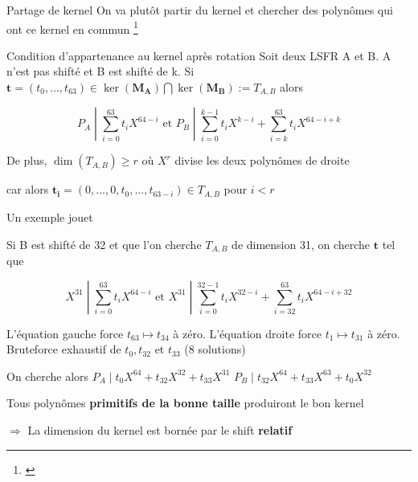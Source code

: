 \begin{frame}{Partage de kernel}
On va plutôt partir du kernel et chercher des polynômes qui ont ce kernel en commun \footnote{\cite{cryptoeprint:2021/829}}
\begin{block}{Condition d'appartenance au kernel après rotation}
    Soit deux LSFR A et B. A n'est pas shifté et B est shifté de k. Si $\mathbf{t}=(t_0,\dots,t_{63})\in\ker(\mathbf{M_A})\bigcap \ker(\mathbf{M_B}) := T_{A,B}$ alors

\[P_A \;|\; \displaystyle\sum_{i=0}^{63} t_i X^{64-i} \text{  et  } P_B \;|\; \displaystyle\sum_{i=0}^{k-1} t_i X^{k-i} + \displaystyle\sum_{i=k}^{63} t_i X^{64-i+k}\]

    De plus, $\dim(T_{A,B}) \geq r$ où $X^r$ divise les deux polynômes de droite
    
    \pause
    
    \small{car alors $\mathbf{t_i}=(0,...,0,t_0,\dots,t_{63-i})\in T_{A,B}$ pour $i<r$}
    \end{block}
\end{frame}

\begin{frame}{Un exemple jouet}
\begin{outline}
    \1  Si B est shifté de 32 et que l'on cherche $T_{A,B}$ de dimension 31, on cherche $\mathbf{t}$ tel que

\[X^{31} \;|\; \displaystyle\sum_{i=0}^{63} t_i X^{64-i} \text{  et  } X^{31} \;|\; \displaystyle\sum_{i=0}^{32-1} t_i X^{32-i} + \displaystyle\sum_{i=32}^{63} t_i X^{64-i+32}\]

\pause

\1 L'équation gauche force $t_{63}\mapsto t_{34}$ à zéro. L'équation droite force $t_{1}\mapsto t_{31}$ à zéro.
    \2 Bruteforce exhaustif de $t_0,t_{32}$ et $t_{33}$ ($8$ solutions)

\pause 

\1 On cherche alors 
    \2 $P_A\;|\;t_0X^{64} + t_{32}X^{32} + t_{33}X^{31}$ 
    \2 $P_B\;|\; t_{32}X^{64} + t_{33}X^{63} + t_0X^{32} $

\pause

\1 Tous polynômes \textbf{primitifs de la bonne taille}  produiront le bon kernel
\end{outline}

$\Rightarrow$ La dimension du kernel est bornée par le shift \textbf{relatif}
\end{frame}

